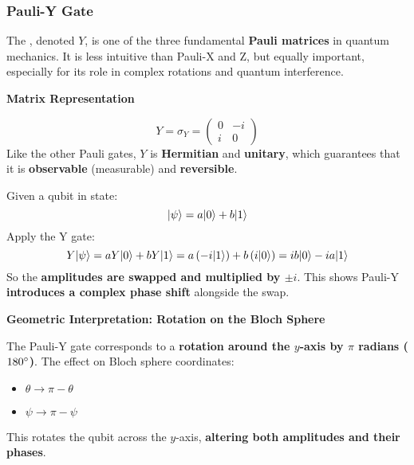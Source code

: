 \subsubsection{Pauli-Y Gate}\label{subsubsection: Pauli-Y Gate}

The , denoted $Y$, is one of the three fundamental \textbf{Pauli matrices} in quantum mechanics. It is less intuitive than Pauli-X and Z, but equally important, especially for its role in complex rotations and quantum interference.

\highspace
\begin{flushleft}
    \textcolor{Green3}{ \textbf{Matrix Representation}}
\end{flushleft}
\begin{equation*}
    Y = \sigma_{Y} = \begin{pmatrix}
        0 & -i \\ i & 0
    \end{pmatrix}
\end{equation*}
Like the other Pauli gates, $Y$ is \textbf{Hermitian} and \textbf{unitary}, which guarantees that it is \textbf{observable} (measurable) and \textbf{reversible}.

\highspace
\begin{flushleft}
    \textcolor{Green3}{}
\end{flushleft}
Given a qubit in state:
\begin{equation*}
	| \psi \rangle = a| 0 \rangle + b| 1 \rangle
\end{equation*}
Apply the Y gate:
\begin{equation*}
	Y| \psi \rangle = aY| 0 \rangle + bY| 1 \rangle = a\left(-i | 1 \rangle\right) + b\left(i | 0 \rangle\right) = ib| 0 \rangle - ia| 1 \rangle
\end{equation*}
So the \textbf{amplitudes are swapped and multiplied by $\pm i$}. This shows Pauli-Y \textbf{introduces a complex phase shift} alongside the swap.

\highspace
\begin{flushleft}
    \textcolor{Green3}{ \textbf{Geometric Interpretation: Rotation on the Bloch Sphere}}
\end{flushleft}
The Pauli-Y gate corresponds to a \textbf{rotation around the $y$-axis by $\pi$ radians ($180 \degree$)}. The effect on Bloch sphere coordinates:
\begin{itemize}
    \item $\theta \rightarrow \pi - \theta$
    \item $\psi \rightarrow \pi - \psi$
\end{itemize}
This rotates the qubit across the $y$-axis, \textbf{altering both amplitudes and their phases}.

